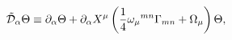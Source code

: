 \begin{equation}
\tilde{{\cal D}}_{\alpha}\Theta \equiv  \partial_{\alpha}\Theta 
+\partial_{\alpha}X^{\mu}\left( {1\over 4}\omega_{\mu}{}^{mn}
\Gamma_{mn} + \Omega_{\mu}\right) \Theta,
\end{equation}

